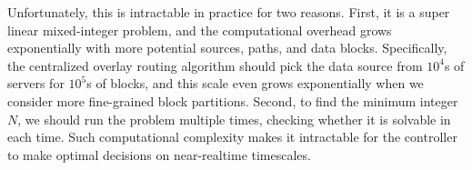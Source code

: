 
Unfortunately, this is intractable in practice for two reasons. First, it is a super linear mixed-integer problem, and the computational overhead grows exponentially with more potential sources, paths, and data blocks. Specifically, the centralized overlay routing algorithm should pick the data source from $10^4$s of servers for $10^5$s of blocks, and this scale even grows exponentially when we consider more fine-grained block partitions. Second, to find the minimum integer $N$, we should run the problem multiple times, checking whether it is solvable in each time. Such computational complexity makes it intractable for the controller to make optimal decisions on near-realtime timescales.



